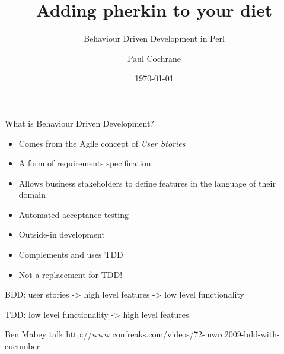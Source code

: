 \documentclass[10pt]{vcs_beamer}
\begin{document}
\author{Paul Cochrane}
\title{Adding pherkin to your diet}
\subtitle{Behaviour Driven Development in Perl}
\date{\today}

\maketitle

\begin{frame}{What is Behaviour Driven Development?}

\begin{itemize}
    \item Comes from the Agile concept of \emph{User Stories}
    \item A form of requirements specification
    \item Allows business stakeholders to define features in the language of
        their domain
    \item Automated acceptance testing
    \item Outside-in development
    \item Complements and uses TDD
    \item Not a replacement for TDD!
\end{itemize}

BDD: user stories -> high level features -> low level functionality

TDD: low level functionality -> high level features

Ben Mabey talk
http://www.confreaks.com/videos/72-mwrc2009-bdd-with-cucumber

\end{frame}
\end{document}
